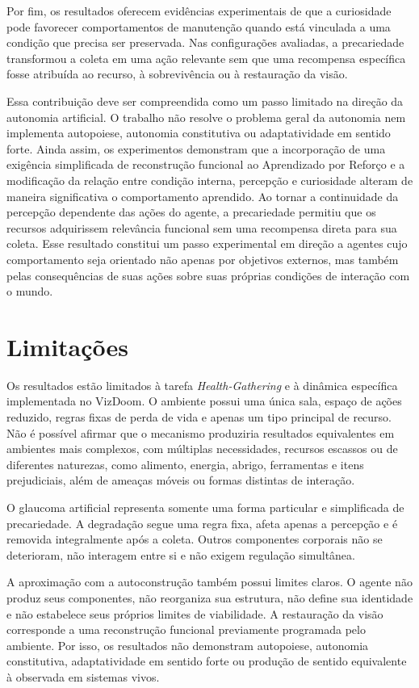 Por fim, os resultados oferecem evidências experimentais de que a curiosidade pode favorecer comportamentos de manutenção quando está vinculada a uma condição que precisa ser preservada. Nas configurações avaliadas, a precariedade transformou a coleta em uma ação relevante sem que uma recompensa específica fosse atribuída ao recurso, à sobrevivência ou à restauração da visão.

Essa contribuição deve ser compreendida como um passo limitado na direção da autonomia artificial. O trabalho não resolve o problema geral da autonomia nem implementa autopoiese, autonomia constitutiva ou adaptatividade em sentido forte. Ainda assim, os experimentos demonstram que a incorporação de uma exigência simplificada de reconstrução funcional ao Aprendizado por Reforço e a modificação da relação entre condição interna, percepção e curiosidade alteram de maneira significativa o comportamento aprendido. Ao tornar a continuidade da percepção dependente das ações do agente, a precariedade permitiu que os recursos adquirissem relevância funcional sem uma recompensa direta para sua coleta. Esse resultado constitui um passo experimental em direção a agentes cujo comportamento seja orientado não apenas por objetivos externos, mas também pelas consequências de suas ações sobre suas próprias condições de interação com o mundo.

\section{Limitações}
\label{sec:limitacoes}

Os resultados estão limitados à tarefa \textit{Health-Gathering} e à dinâmica específica implementada no VizDoom. O ambiente possui uma única sala, espaço de ações reduzido, regras fixas de perda de vida e apenas um tipo principal de recurso. Não é possível afirmar que o mecanismo produziria resultados equivalentes em ambientes mais complexos, com múltiplas necessidades, recursos escassos ou de diferentes naturezas, como alimento, energia, abrigo, ferramentas e itens prejudiciais, além de ameaças móveis ou formas distintas de interação.

O glaucoma artificial representa somente uma forma particular e simplificada de precariedade. A degradação segue uma regra fixa, afeta apenas a percepção e é removida integralmente após a coleta. Outros componentes corporais não se deterioram, não interagem entre si e não exigem regulação simultânea.

A aproximação com a autoconstrução também possui limites claros. O agente não produz seus componentes, não reorganiza sua estrutura, não define sua identidade e não estabelece seus próprios limites de viabilidade. A restauração da visão corresponde a uma reconstrução funcional previamente programada pelo ambiente. Por isso, os resultados não demonstram autopoiese, autonomia constitutiva, adaptatividade em sentido forte ou produção de sentido equivalente à observada em sistemas vivos.

